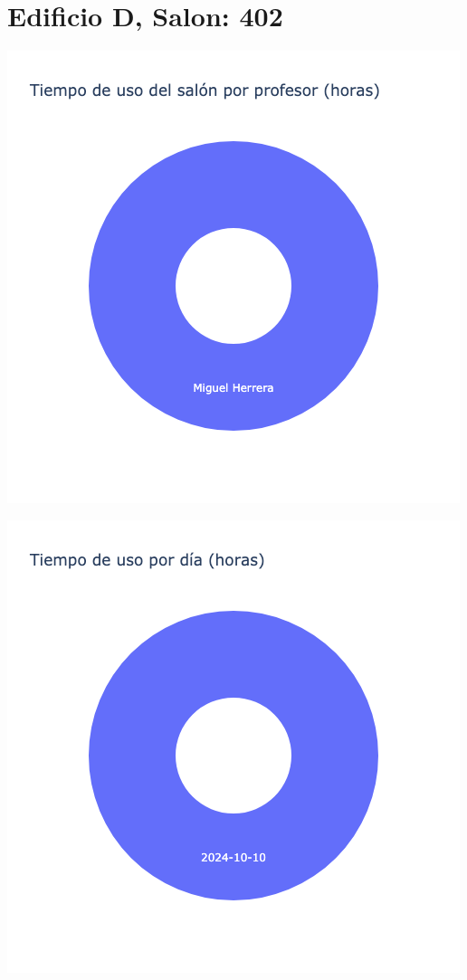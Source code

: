 \documentclass{article}
\begin{document}
    \section{Edificio D, Salon: 402}
    \noindent
    \begin{minipage}{0.48\textwidth}
        \centering
        \includegraphics[width=\textwidth]{../img/pie/UP402-90Dias-03-12-2024.png}
    \end{minipage}
    \hfill
    \begin{minipage}{0.48\textwidth}
        \centering
        \includegraphics[width=\textwidth]{../img/pie/UD402-90Dias-03-12-2024.png}
    \end{minipage}
    
\end{document}
